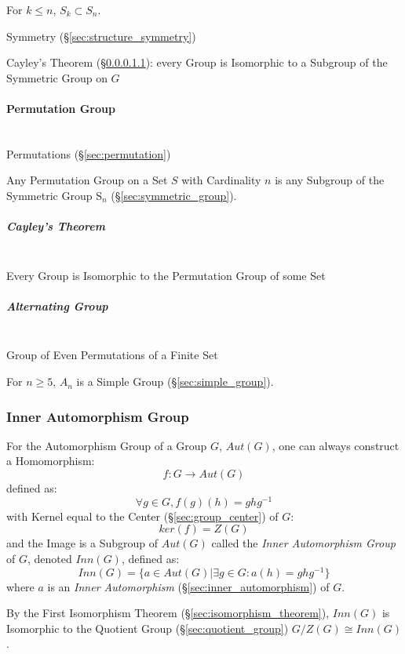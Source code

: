 For $k \leq n$, $S_k \subset S_n$.

Symmetry (\S\ref{sec:structure_symmetry})

Cayley's Theorem (\S\ref{sec:cayleys_theorem}): every Group is
Isomorphic to a Subgroup of the Symmetric Group on $G$



\paragraph{Permutation Group}\label{sec:permutation_group}
\hfill \\

Permutations (\S\ref{sec:permutation})

Any Permutation Group on a Set $S$ with Cardinality $n$ is any
Subgroup of the Symmetric Group $\mathrm{S}_n$
(\S\ref{sec:symmetric_group}).



\subparagraph{Cayley's Theorem}\label{sec:cayleys_theorem}
\hfill \\

Every Group is Isomorphic to the Permutation Group of some Set



\subparagraph{Alternating Group}\label{sec:alternating_group}
\hfill \\

Group of Even Permutations of a Finite Set

For $n \geq 5$, $A_n$ is a Simple Group (\S\ref{sec:simple_group}).



\subsubsection{Inner Automorphism Group}\label{sec:inner_automorphism_group}

For the Automorphism Group of a Group $G$, $Aut(G)$, one can always
construct a Homomorphism:
\[
    f : G \rightarrow Aut(G)
\]
defined as:
\[
    \forall g \in G, f (g) (h) = g h g^{-1}
\]
with Kernel equal to the Center (\S\ref{sec:group_center}) of $G$:
\[
    ker(f) = Z(G)
\]
and the Image is a Subgroup of $Aut(G)$ called the \emph{Inner
  Automorphism Group} of $G$, denoted $Inn(G)$, defined as:
\[
    Inn(G) = \{ a \in Aut(G) | \exists g \in G : a(h) = g h g^{-1} \}
\]
where $a$ is an \emph{Inner Automorphism}
(\S\ref{sec:inner_automorphism}) of $G$.

By the First Isomorphism Theorem (\S\ref{sec:isomorphism_theorem}),
$Inn(G)$ is Isomorphic to the Quotient Group
(\S\ref{sec:quotient_group}) $G / Z(G) \cong Inn(G)$.



